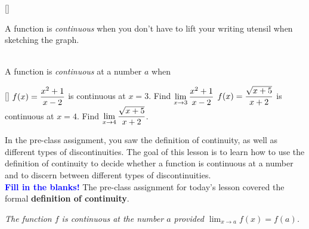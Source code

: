 \documentclass[10pt]{article}
\begin{document}
[]{
\begin{center}{\bf {}} \end{center}
A function is {\em continuous} when you don't have to lift your writing utensil when sketching the graph.
~\\
{\bf{}}
}{
\begin{center}\\
A function is {\em continuous} at a number $a$  when \\
\centering {}\end{center}
}

[]{
\example {} $\displaystyle f(x)=\frac{x^2+1}{x-2}$ is continuous at $x=3$. Find $\displaystyle \lim_{x\to3} \frac{x^2+1}{x-2}$ 
}{
{\exercise }  $\displaystyle f(x)=\frac{\sqrt{x+5}}{x+2}$ is continuous at $x=4$. Find $\displaystyle \lim_{x\to4} \frac{\sqrt{x+5}}{x+2}$.
}

\mod In the pre-class assignment, you saw the definition of continuity, as well as different types of discontinuities. The goal of this lesson is to learn how to use the definition of continuity to decide whether a function is continuous at a number and to discern between different types of discontinuities.\\

{\bf \textcolor{blue}{Fill in the blanks!}} The pre-class assignment for today's lesson covered the formal {\bf definition of continuity}. 
\begin{center}
{\it The function $f$ is continuous at the number $a$ provided $\displaystyle\lim_{x\to a} f(x)=f(a)$.} \\ %
\end{center}
\end{document}
